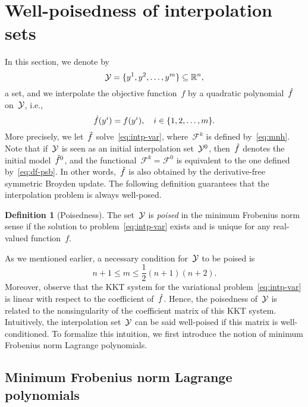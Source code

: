 \documentclass[draft]{article}
\numberwithin{equation}{section}
\theoremstyle{definition}
\newtheorem{definition}{Definition}[section]
\theoremstyle{plain}
\newcommand*{\obj}{f}
\newcommand*{\objm}[1][]{\hat{\obj}\ifblank{#1}{}{^{#1}}}
\newcommand*{\R}{\mathbb{R}}
\newcommand*{\set}[2][]{#1\{#2#1\}}
\newcommand*{\xpt}[1][]{\mathcal{Y}\ifblank{#1}{}{^{#1}}}
\begin{document}
\section{Well-poisedness of interpolation sets}
\label{sec:well-poisedness}

In this section, we denote by
\begin{equation*}
    \xpt = \set{y^1, y^2, \dots, y^m} \subseteq \R^n,
\end{equation*}
a set, and we interpolate the objective function~$\obj$ by a quadratic polynomial~$\objm$ on~$\xpt$, i.e.,
\begin{equation}
    \label{eq:intp-cond-gen}
    \objm(y^i) = \obj(y^i), \quad i \in \set{1, 2, \dots, m}.
\end{equation}
More precisely, we let~$\objm$ solve~\eqref{eq:intp-var}, where~$\mathcal{F}^k$ is defined by~\eqref{eq:mnh}.
Note that if~$\xpt$ is seen as an initial interpolation set~$\xpt[0]$, then~$\objm$ denotes the initial model~$\objm[0]$, and the functional~$\mathcal{F}^k = \mathcal{F}^0$ is equivalent to the one defined by~\eqref{eq:df-psb}.
In other words,~$\objm$ is also obtained by the derivative-free symmetric Broyden update.
The following definition guarantees that the interpolation problem is always well-posed.

\begin{definition}[Poisedness]
    The set~$\xpt$ is \emph{poised} in the minimum Frobenius norm sense if the solution to problem~\eqref{eq:intp-var} exists and is unique for any real-valued function~$\obj$.
\end{definition}

As we mentioned earlier, a necessary condition for~$\xpt$ to be poised is
\begin{equation*}
    n + 1 \le m \le \frac{1}{2} (n + 1) (n + 2).
\end{equation*}
Moreover, observe that the KKT system for the variational problem~\eqref{eq:intp-var} is linear with respect to the coefficient of~$\objm$.
Hence, the poisedness of~$\xpt$ is related to the nonsingularity of the coefficient matrix of this KKT system.
Intuitively, the interpolation set~$\xpt$ can be said well-poised if this matrix is well-conditioned.
To formalize this intuition, we first introduce the notion of minimum Frobenius norm Lagrange polynomials.

\subsection{Minimum Frobenius norm Lagrange polynomials}
\end{document}
